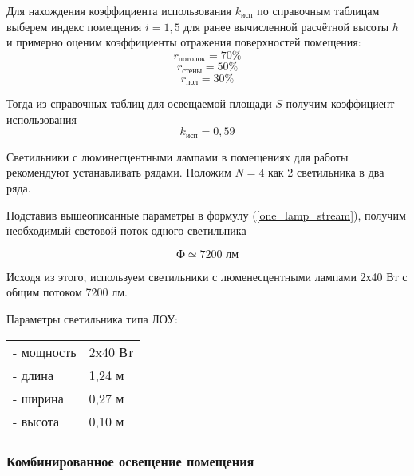 Для нахождения коэффициента использования $k_\text{исп}$ по справочным таблицам
выберем индекс помещения $i = 1,5$ для ранее вычисленной расчётной высоты $h$ и
примерно оценим коэффициенты отражения поверхностей помещения:
$$
    r_\text{потолок} = 70\%
$$
$$
    r_\text{стены} = 50\%
$$
$$
    r_\text{пол} = 30\%
$$

Тогда из справочных таблиц для освещаемой площади $S$ получим коэффициент использования
$$
    k_\text{исп} = 0,59
$$

Светильники с люминесцентными лампами в помещениях для работы рекомендуют
устанавливать рядами. Положим $N = 4$ как 2 светильника в два ряда.

Подставив вышеописанные параметры в формулу (\ref{one_lamp_stream}), получим
необходимый световой поток одного светильника

$$
    \text{Ф} \simeq 7200 \text{ лм}
$$

Исходя из этого, используем светильники с люменесцентными лампами 2х40 Вт с
общим потоком 7200 лм.

Параметры светильника типа ЛОУ:

\begin{tabular}{ll}
    - мощность    & 2x40 Вт   \\
    - длина       & 1,24 м    \\
    - ширина      & 0,27 м    \\
    - высота      & 0,10 м    \\
\end{tabular}


\subsubsection{Комбинированное освещение помещения}
